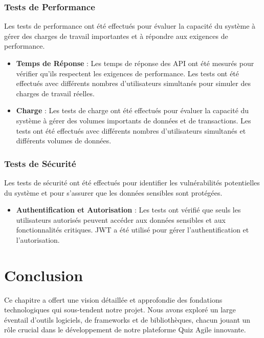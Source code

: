 \documentclass[12pt,a4paper]{report}
\begin{document}
\subsubsection{Tests de Performance}

Les tests de performance ont été effectués pour évaluer la capacité du système à gérer des charges de travail importantes et à répondre aux exigences de performance.

\begin{itemize}
\item \textbf{Temps de Réponse} : Les temps de réponse des API ont été mesurés pour vérifier qu'ils respectent les exigences de performance. Les tests ont été effectués avec différents nombres d'utilisateurs simultanés pour simuler des charges de travail réelles.

\item \textbf{Charge} : Les tests de charge ont été effectués pour évaluer la capacité du système à gérer des volumes importants de données et de transactions. Les tests ont été effectués avec différents nombres d'utilisateurs simultanés et différents volumes de données.
\end{itemize}

\subsubsection{Tests de Sécurité}

Les tests de sécurité ont été effectués pour identifier les vulnérabilités potentielles du système et pour s'assurer que les données sensibles sont protégées.

\begin{itemize}
\item \textbf{Authentification et Autorisation} : Les tests ont vérifié que seuls les utilisateurs autorisés peuvent accéder aux données sensibles et aux fonctionnalités critiques. JWT a été utilisé pour gérer l'authentification et l'autorisation.
\end{itemize}

\section{Conclusion}

Ce chapitre a offert une vision détaillée et approfondie des fondations technologiques qui sous-tendent notre projet. Nous avons exploré un large éventail d'outils logiciels, de frameworks et de bibliothèques, chacun jouant un rôle crucial dans le développement de notre plateforme Quiz Agile innovante.
\end{document}
